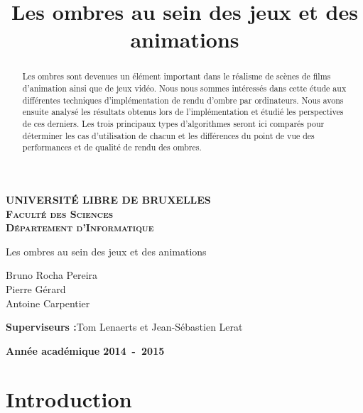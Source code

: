 \documentclass[a4paper,10pt]{report}
\title{Les ombres au sein des jeux et des animations}
\begin{document}
\newcommand*{\captionsource}[2]{%
  \caption[{#1}]{%
    #1%
    \\\hspace{\linewidth}%
    \textbf{Source:} #2%
  }%
}



\begin{titlepage}
\begin{center}
\textbf{\textsc{UNIVERSIT\'E LIBRE DE BRUXELLES}}\\
\textbf{\textsc{Faculté des Sciences}}\\
\textbf{\textsc{Département d'Informatique}}
\vfill{}\vfill{}
\begin{center}{\Huge Les ombres au sein des jeux et des animations}\end{center}{\Huge \par}
\begin{center}{\large Bruno Rocha Pereira\\ Pierre Gérard\\ Antoine Carpentier}\end{center}{\Huge \par}
\vfill{}\vfill{}
\begin{flushleft}{\large \textbf{Superviseurs :}}\hfill{Tom Lenaerts et Jean-Sébastien Lerat}\end{flushleft}{\large\par}
\vfill{}\vfill{}\enlargethispage{3cm}
\textbf{Année académique 2014~-~2015}
\end{center}
\end{titlepage}

\begin{abstract}
Les ombres sont devenues un élément important dans le réalisme de scènes de films d'animation ainsi que de jeux vidéo. Nous nous sommes intéressés dans cette étude aux différentes techniques d'implémentation de rendu d'ombre par ordinateurs. Nous avons ensuite analysé les résultats obtenus lors de l'implémentation et étudié les perspectives de ces derniers. Les trois principaux types d'algorithmes seront ici comparés pour déterminer les cas d'utilisation de chacun et les différences du point de vue des performances et de qualité de rendu des ombres.
\end{abstract}



\tableofcontents


\chapter{Introduction}
\end{document}
